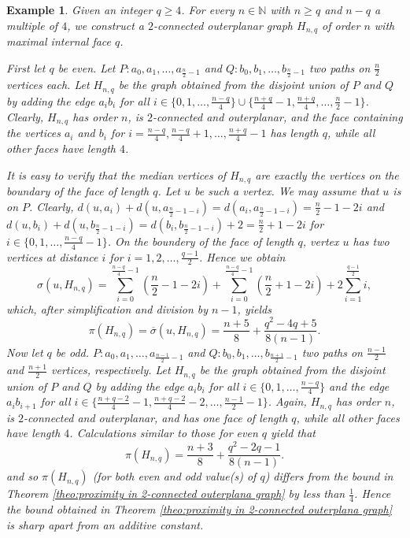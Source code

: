 \documentclass[a4paper,11pt]{article}
\newtheorem{example}{Example}[section]
\numberwithin{equation}{theorem}
\begin{document}
\begin{example}{\rm
Given an integer $q \geq 4$. For every $n \in \mathbb{N}$ with $n\geq q$ and $n-q$ a multiple of $4$, 
we construct a $2$-connected outerplanar graph $H_{n,q}$ of order $n$ with maximal internal 
face $q$.  

First let $q$ be even. Let $P:a_0, a_1,\ldots,a_{\frac{n}{2}-1}$ and 
$Q:b_0, b_1,\ldots,b_{\frac{n}{2}-1}$ two paths on $\frac{n}{2}$ vertices each. Let $H_{n,q}$ be the graph obtained from the disjoint union of $P$ and $Q$ by adding the edge $a_i b_i$ for all 
$i \in \{0,1,\ldots,\frac{n-q}{4}\} \cup \{\frac{n+q}{4}-1, \frac{n+q}{4}, \ldots, 
   \frac{n}{2}-1\}$. 
Clearly, $H_{n,q}$ has order $n$, is $2$-connected and outerplanar, and the face containing the vertices $a_i$ and $b_i$ for 
$i=\frac{n-q}{4}, \frac{n-q}{4}+1,\ldots, \frac{n+q}{4}-1$ has length $q$, while all other faces have length $4$. 

It is easy to verify that the median vertices of $H_{n,q}$ are exactly the vertices on the 
boundary of the face of length $q$. Let $u$ be such a vertex. We may assume that $u$ is on $P$. Clearly, 
$d(u,a_i) + d(u,a_{\frac{n}{2}-1-i}) = d(a_i,a_{\frac{n}{2}-1-i})  = \frac{n}{2}-1-2i$ 	and 
$d(u,b_i) + d(u,b_{\frac{n}{2}-1-i}) = d(b_i,b_{\frac{n}{2}-1-i}) +2  = \frac{n}{2}+1-2i$ for 
$i \in \{0,1,\ldots, \frac{n-q}{4}-1\}$. 
On the boundery of the face of length $q$, vertex $u$ has two vertices at distance $i$ for 
$i=1,2,\ldots, \frac{q-1}{2}$. Hence we obtain 
\[  \sigma(u,H_{n,q}) = \sum_{i=0}^{\frac{n-q}{4}-1} \left( \frac{n}{2}-1-2i \right)  
              + \sum_{i=0}^{\frac{n-q}{4}-1} \left( \frac{n}{2}+1-2i \right)  
              + 2 \sum_{i=1}^{\frac{q-1}{2}} i, \]
which, after simplification and division by $n-1$, yields 
\[ \pi(H_{n,q}) =  \overline{\sigma}(u,H_{n,q}) 
  =  \dfrac{n+5}{8}+\dfrac{q^2-4q+5}{8(n-1)}.\]
Now let $q$ be odd. $P:a_0, a_1,\ldots,a_{\frac{n-1}{2}-1}$ and 
$Q:b_0, b_1,\ldots,b_{\frac{n+1}{2}-1}$ two paths on $\frac{n-1}{2}$ and $\frac{n+1}{2}$ vertices,
respectively.  Let $H_{n,q}$ be the graph obtained from the disjoint union of $P$ and $Q$ by 
adding the edge $a_i b_i$ for all $i \in \{0,1,\ldots,\frac{n-q}{4}\}$ 
and the edge $a_ib_{i+1}$ for all $i \in \{\frac{n+q-2}{4}-1, \frac{n+q-2}{4}-2, \ldots, 
   \frac{n-1}{2}-1\}$. 
Again, $H_{n,q}$ has order $n$, is $2$-connected and outerplanar, and has one face of length $q$, 
while all other faces have length $4$. Calculations similar to those for even $q$ yield that
\[ \pi(H_{n,q}) =  \dfrac{n+3}{8}+\dfrac{q^2-2q-1}{8(n-1)}.\]   
and so $\pi(H_{n,q})$ (for both even and odd value(s) of $q$) differs from the bound in 
Theorem \ref{theo:proximity in 2-connected outerplana graph}  by less than $\frac{1}{4}$. 
Hence the bound obtained in Theorem \ref{theo:proximity in 2-connected outerplana graph} is sharp apart from an additive constant.
}
\end{example}
\end{document}
